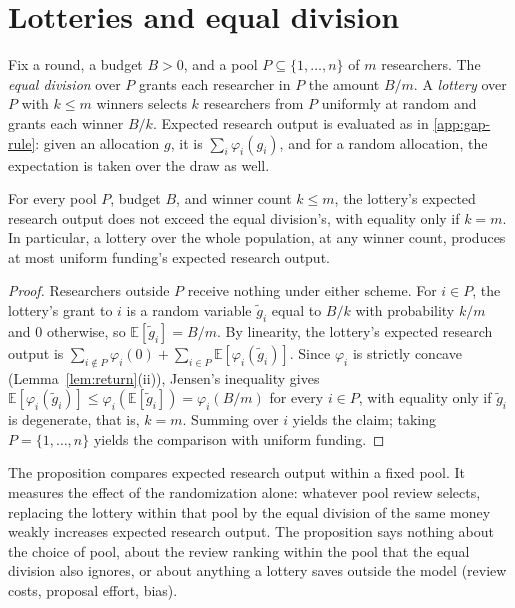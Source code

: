 \section{Lotteries and equal division}\label{app:lottery}

Fix a round, a budget $B > 0$, and a pool $P \subseteq \{1, \ldots, n\}$ of $m$ researchers. The \emph{equal division} over $P$ grants each researcher in $P$ the amount $B/m$. A \emph{lottery} over $P$ with $k \leq m$ winners selects $k$ researchers from $P$ uniformly at random and grants each winner $B/k$. Expected research output is evaluated as in \ref{app:gap-rule}: given an allocation $g$, it is $\sum_i \varphi_i(g_i)$, and for a random allocation, the expectation is taken over the draw as well.

\begin{prop}\label{prop:lottery}
For every pool $P$, budget $B$, and winner count $k \leq m$, the lottery's expected research output does not exceed the equal division's, with equality only if $k = m$. In particular, a lottery over the whole population, at any winner count, produces at most uniform funding's expected research output.
\end{prop}

\begin{proof}
Researchers outside $P$ receive nothing under either scheme. For $i \in P$, the lottery's grant to $i$ is a random variable $\tilde g_i$ equal to $B/k$ with probability $k/m$ and $0$ otherwise, so $\mathbb{E}[\tilde g_i] = B/m$. By linearity, the lottery's expected research output is $\sum_{i \notin P} \varphi_i(0) + \sum_{i \in P} \mathbb{E}[\varphi_i(\tilde g_i)]$. Since $\varphi_i$ is strictly concave (Lemma~\ref{lem:return}(ii)), Jensen's inequality gives $\mathbb{E}[\varphi_i(\tilde g_i)] \leq \varphi_i(\mathbb{E}[\tilde g_i]) = \varphi_i(B/m)$ for every $i \in P$, with equality only if $\tilde g_i$ is degenerate, that is, $k = m$. Summing over $i$ yields the claim; taking $P = \{1, \ldots, n\}$ yields the comparison with uniform funding.
\end{proof}

\begin{remark}
The proposition compares expected research output within a fixed pool. It measures the effect of the randomization alone: whatever pool review selects, replacing the lottery within that pool by the equal division of the same money weakly increases expected research output. The proposition says nothing about the choice of pool, about the review ranking within the pool that the equal division also ignores, or about anything a lottery saves outside the model (review costs, proposal effort, bias).
\end{remark}

